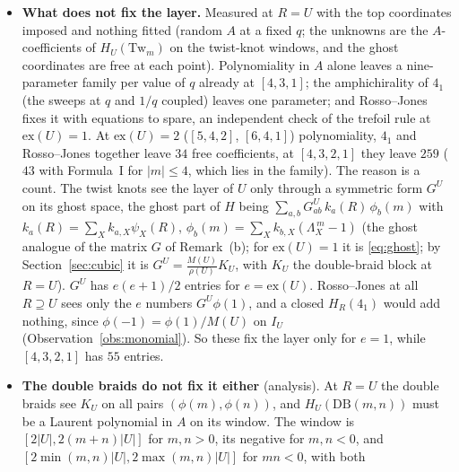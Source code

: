 \documentclass[11pt]{article}
\newcommand{\Tw}{\mathrm{Tw}}
\newcommand{\Lam}{\Lambda}
\begin{document}
\begin{itemize}
(Observation~\ref{obs:topweight}).  So the free directions of the top rows drop out, and only the $\mathrm{ex}(U)$ ghost
coordinates of $Y$ are open.  For $U=[4,3,2,1]$: $\dim I_U=24=12+2+10$; the lower part ($118$ terms, four of them from
split channels, and the trefoil-rule ghost terms of $[4,3,1]$ and $[3,2,2,1]$) is term by term that of the closed
$[4,3,2,1]$ block of the other branch, which reproduces Formula~I for $|m|\le4$ and Rosso--Jones; and the block's $Y$ lies
in $I_U$ with the predicted top coordinates, $m_c=2$ on the three separate/separate tops (two points).  So at
$R=[4,3,2,1]$ exactly ten numbers per point are open, more than the eight twist knots of Formula~I can fix.
\item \textbf{What does not fix the layer.}  Measured at $R=U$ with the top coordinates imposed and nothing fitted
(random $A$ at a fixed $q$; the unknowns are the $A$-coefficients of $H_U(\Tw_m)$ on the twist-knot windows, and the
ghost coordinates are free at each point).  Polynomiality in $A$ alone leaves a nine-parameter family per value of $q$
already at $[4,3,1]$; the amphichirality of $4_1$ (the sweeps at $q$ and $1/q$ coupled) leaves one parameter; and
Rosso--Jones fixes it with equations to spare, an independent check of the trefoil rule at $\mathrm{ex}(U)=1$.  At
$\mathrm{ex}(U)=2$ ($[5,4,2]$, $[6,4,1]$) polynomiality, $4_1$ and Rosso--Jones together leave $34$ free coefficients, at
$[4,3,2,1]$ they leave $259$ ($43$ with Formula~I for $|m|\le4$, which lies in the family).  The reason is a count.  The
twist knots see the layer of $U$ only through a symmetric form $G^U$ on its ghost space, the ghost part of $H$ being
$\sum_{a,b}G^U_{ab}\,k_a(R)\,\phi_b(m)$ with $k_a(R)=\sum_Xk_{a,X}\psi_X(R)$, $\phi_b(m)=\sum_Xk_{b,X}(\Lam_X^{\,m}-1)$
(the ghost analogue of the matrix $G$ of Remark~(b); for $\mathrm{ex}(U)=1$ it is \eqref{eq:ghost}; by
Section~\ref{sec:cubic} it is $G^U=\frac{M(U)}{\rho(U)}K_U$, with $K_U$ the double-braid block at $R=U$).  $G^U$ has
$e(e+1)/2$ entries for $e=\mathrm{ex}(U)$.  Rosso--Jones at all $R\supseteq U$ sees only the $e$ numbers $G^U\phi(1)$,
and a closed $H_R(4_1)$ would add nothing, since $\phi(-1)=\phi(1)/M(U)$ on $I_U$ (Observation~\ref{obs:monomial}).  So
these fix the layer only for $e=1$, while $[4,3,2,1]$ has $55$ entries.
\item \textbf{The double braids do not fix it either} (analysis).  At $R=U$ the double braids see $K_U$ on all pairs
$(\phi(m),\phi(n))$, and $H_U(\mathrm{DB}(m,n))$ must be a Laurent polynomial in $A$ on its window.  The window is
$[2|U|,2(m+n)|U|]$ for $m,n>0$, its negative for $m,n<0$, and $[2\min(m,n)|U|,2\max(m,n)|U|]$ for $mn<0$, with both

\end{itemize}
\end{document}
